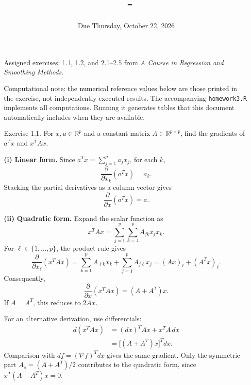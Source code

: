 \documentclass[answers,12pt,addpoints]{exam}
\author{\name}
\title{\course\ - \assignment}
\date{Due Thursday, October 22, 2026}
\begin{document}
\maketitle

\noindent Assigned exercises: 1.1, 1.2, and 2.1--2.5 from
\emph{A Course in Regression and Smoothing Methods}.

\medskip
\noindent Computational note: the numerical reference values below are those
printed in the exercise, not independently executed results. The accompanying
\texttt{homework3.R} implements all computations. Running it generates tables
that this document automatically includes when they are available.

\newpage
\begin{questions}

\question Exercise 1.1. For $x,a\in\mathbb R^p$ and a constant matrix
$A\in\mathbb R^{p\times p}$, find the gradients of $a^Tx$ and $x^TAx$.
\begin{solution}
\textbf{(i) Linear form.}
Since $a^Tx=\sum_{j=1}^p a_jx_j$, for each $k$,
\[
\frac{\partial}{\partial x_k}(a^Tx)=a_k.
\]
Stacking the partial derivatives as a column vector gives
\[
\boxed{\frac{\partial}{\partial x}(a^Tx)=a.}
\]

\textbf{(ii) Quadratic form.}
Expand the scalar function as
\[
x^TAx=\sum_{j=1}^p\sum_{k=1}^p A_{jk}x_jx_k.
\]
For $\ell\in\{1,\ldots,p\}$, the product rule gives
\[
\frac{\partial}{\partial x_\ell}(x^TAx)
=\sum_{k=1}^p A_{\ell k}x_k+\sum_{j=1}^p A_{j\ell}x_j
=(Ax)_\ell+(A^Tx)_\ell.
\]
Consequently,
\[
\boxed{\frac{\partial}{\partial x}(x^TAx)=(A+A^T)x.}
\]
If $A=A^T$, this reduces to $2Ax$.

For an alternative derivation, use differentials:
\begin{align*}
d(x^TAx)&=(dx)^TAx+x^TA\,dx\\
&=\bigl[(A+A^T)x\bigr]^Tdx.
\end{align*}
Comparison with $df=(\nabla f)^Tdx$ gives the same gradient.
Only the symmetric part $A_s=(A+A^T)/2$ contributes to the
quadratic form, since $x^T(A-A^T)x=0$.
\end{solution}


\end{questions}
\end{document}
